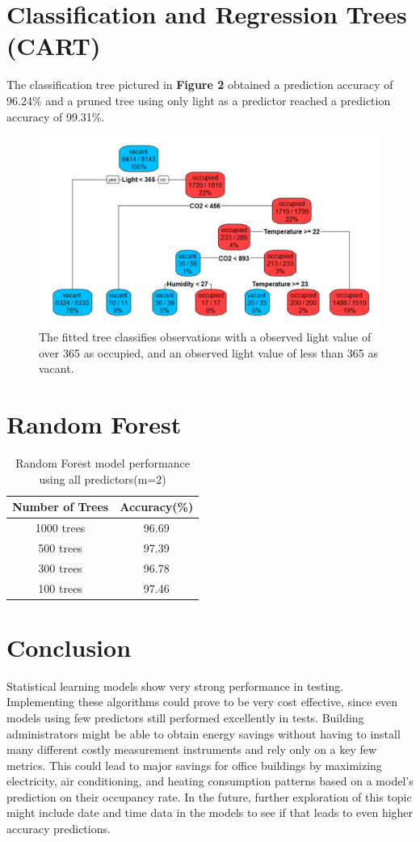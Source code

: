\documentclass{article}
\begin{document}
\section{Classification and Regression Trees (CART)}
The classification tree pictured in \textbf{Figure 2} obtained a prediction accuracy of 96.24\% and a pruned tree using only light as a predictor reached a prediction accuracy of 99.31\%.
\begin{figure}[H]
	\includegraphics[width = \textwidth]{cart.png}
	\caption{The fitted tree classifies observations with a observed light value of over 365 as occupied, and an observed light value of less than 365 as vacant.}
\end{figure}

\section{Random Forest}

\begin{table}[H]
	\centering
	\caption{Random Forest model performance using all predictors(m=2)}
	\begin{tabular}{c|c}
	Number of Trees & Accuracy(\%) \\
	\hline\hline
	1000 trees & 96.69 \\
	\hline
	500 trees & 97.39 \\
	\hline
	300 trees & 96.78 \\
	\hline
	100 trees & 97.46 \\
	\end{tabular}
\end{table}

\section{Conclusion}
Statistical learning models show very strong performance in testing. Implementing these algorithms could prove to be very cost effective, since even models using few predictors still performed excellently in tests. Building administrators might be able to obtain energy savings without having to install many different costly measurement instruments and rely only on a key few metrics. This could lead to major savings for office buildings by maximizing electricity, air conditioning, and heating consumption patterns based on a model's prediction on their occupancy rate. In the future, further exploration of this topic might include date and time data in the models to see if that leads to even higher accuracy predictions.
\end{document}
